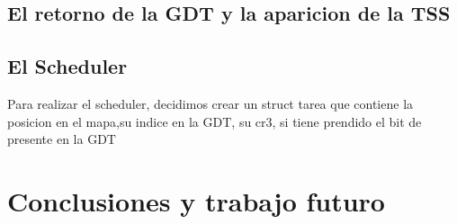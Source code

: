 \documentclass[a4paper]{article}
\newenvironment{codesnippet}{%
	\begin{Sbox}\begin{minipage}{\textwidth}\sffamily\small}%
	{\end{minipage}\end{Sbox}%
		\begin{center}%
		\vspace{-0.4cm}\colorbox{litegrey}{\TheSbox}\end{center}\vspace{0.3cm}}
\begin{document}
\subsection{El retorno de la GDT y la aparicion de la TSS}

\subsection{El Scheduler}
Para realizar el scheduler, decidimos crear un struct tarea que contiene la posicion en el mapa,su indice en la GDT, su cr3, si tiene prendido el bit de presente en la GDT

\section{Conclusiones y trabajo futuro}






\end{document}
